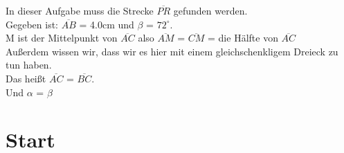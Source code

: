 \documentclass[12pt, a4paper]{article}
\begin{document}
 
	 
	\begin{flushleft}

		In dieser Aufgabe muss die Strecke \(\overline{PR}\) gefunden werden.
		\\Gegeben ist: \(\overline{AB}\) = 4.0cm und \(\beta\) = \(72^\circ\).
		\\M ist der Mittelpunkt von \(\overline{AC}\) also \(\overline{AM}\) = \(\overline{CM}\) = die  
		 Hälfte von \(\overline{AC}\)
		\\Außerdem wissen wir, dass wir es hier mit einem gleichschenkligem Dreieck zu tun haben.
		\\Das heißt \(\overline{AC}\) = \(\overline{BC}\).
		\\Und \(\alpha\) = \(\beta\)
			

	\end{flushleft}
	
	\section*{Start}
	
\end{document}
